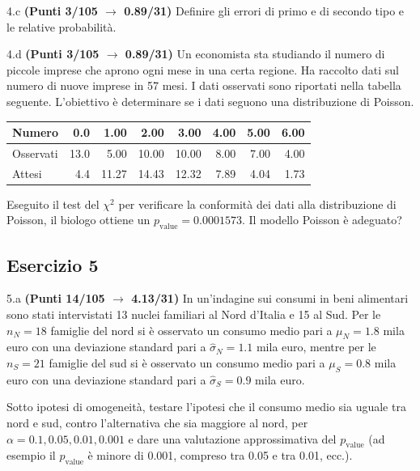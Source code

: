 \documentclass[
  11pt,
]{book}
\theoremstyle{mytheoremstyle}
\theoremstyle{mydefstyle}
\begin{document}
4.c \textbf{(Punti 3/105 \(\rightarrow\) 0.89/31)} Definire gli errori di primo e di secondo tipo e le relative probabilità.

4.d \textbf{(Punti 3/105 \(\rightarrow\) 0.89/31)} Un economista sta studiando il numero di piccole imprese che aprono ogni mese in una certa regione. Ha raccolto dati sul numero di nuove imprese in 57 mesi. I dati osservati sono riportati nella tabella seguente. L'obiettivo è determinare se i dati seguono una distribuzione di Poisson.

\begin{table}[H]
\centering
\begin{tabular}{l|r|r|r|r|r|r|r}
\hline
Numero & 0.0 & 1.00 & 2.00 & 3.00 & 4.00 & 5.00 & 6.00\\
\hline
Osservati & 13.0 & 5.00 & 10.00 & 10.00 & 8.00 & 7.00 & 4.00\\
\hline
Attesi & 4.4 & 11.27 & 14.43 & 12.32 & 7.89 & 4.04 & 1.73\\
\hline
\end{tabular}
\end{table}

Eseguito il test del \(\chi^2\) per verificare la conformità dei dati alla distribuzione di Poisson, il biologo ottiene un \(p_\text{value}=0.0001573\). Il modello Poisson è adeguato?

\subsection{Esercizio 5}\label{esercizio-5-37}

5.a \textbf{(Punti 14/105 \(\rightarrow\) 4.13/31)} In un'indagine sui consumi in beni alimentari sono stati intervistati 13 nuclei familiari al Nord d'Italia e 15 al Sud.
Per le \(n_N=18\) famiglie del nord si è osservato un consumo medio pari a \(\mu_N=1.8\) mila euro con una deviazione standard pari a \(\hat\sigma_N=1.1\) mila euro, mentre per le \(n_S=21\) famiglie del sud si è osservato un consumo medio pari a \(\mu_S=0.8\) mila euro con una deviazione standard pari a \(\hat\sigma_S=0.9\) mila euro.

Sotto ipotesi di omogeneità, testare l'ipotesi che il consumo medio sia uguale tra nord e sud, contro l'alternativa che sia maggiore al nord,
per \(\alpha=0.1,0.05,0.01,0.001\) e dare una valutazione approssimativa del \(p_\text{value}\) (ad esempio il \(p_\text{value}\) è minore di 0.001, compreso tra 0.05 e tra 0.01, ecc.).
\end{document}
